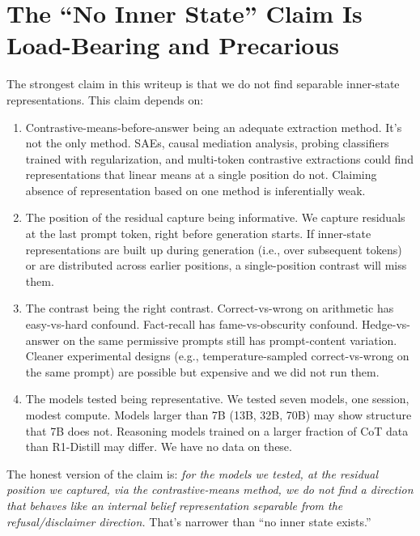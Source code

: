 \documentclass[11pt,a4paper]{article}
\begin{document}
\section{The ``No Inner State'' Claim Is Load-Bearing and Precarious}

The strongest claim in this writeup is that we do not find separable inner-state representations. This claim depends on:

\begin{enumerate}
\item Contrastive-means-before-answer being an adequate extraction method. It's not the only method. SAEs, causal mediation analysis, probing classifiers trained with regularization, and multi-token contrastive extractions could find representations that linear means at a single position do not. Claiming absence of representation based on one method is inferentially weak.

\item The position of the residual capture being informative. We capture residuals at the last prompt token, right before generation starts. If inner-state representations are built up during generation (i.e., over subsequent tokens) or are distributed across earlier positions, a single-position contrast will miss them.

\item The contrast being the right contrast. Correct-vs-wrong on arithmetic has easy-vs-hard confound. Fact-recall has fame-vs-obscurity confound. Hedge-vs-answer on the same permissive prompts still has prompt-content variation. Cleaner experimental designs (e.g., temperature-sampled correct-vs-wrong on the same prompt) are possible but expensive and we did not run them.

\item The models tested being representative. We tested seven models, one session, modest compute. Models larger than 7B (13B, 32B, 70B) may show structure that 7B does not. Reasoning models trained on a larger fraction of CoT data than R1-Distill may differ. We have no data on these.
\end{enumerate}

The honest version of the claim is: \emph{for the models we tested, at the residual position we captured, via the contrastive-means method, we do not find a direction that behaves like an internal belief representation separable from the refusal/disclaimer direction.} That's narrower than ``no inner state exists.''

\end{document}
